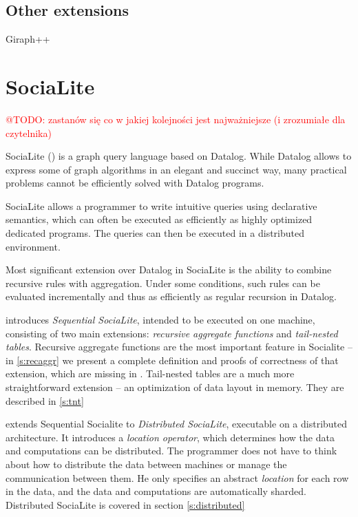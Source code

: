 \documentclass{pracamgr}
\makeatletter
\theoremstyle{plain}
\theoremstyle{definition}
\theoremstyle{remark}
\newcommand{\todo}[1]{\textcolor{red}{@TODO: #1}}
\makeatother
\begin{document}
\section{Other extensions}
Giraph++



\chapter{SociaLite}\label{r:socialite}

\todo{zastanów się co w jakiej kolejności jest najważniejsze (i zrozumiałe dla czytelnika)}

SociaLite (\cite{socialite, distsoc}) is a graph query language based on Datalog. While Datalog allows to express some of graph algorithms
in an elegant and succinct way, many practical problems cannot be efficiently solved with Datalog programs. 

SociaLite allows a programmer to write intuitive queries using declarative semantics, which can often be executed as efficiently as highly optimized dedicated programs. The queries can then be executed in a distributed environment.

Most significant extension over Datalog in SociaLite is the ability to combine recursive rules with aggregation. Under some conditions, such rules can be evaluated incrementally and thus as efficiently as regular recursion in Datalog.

\cite{socialite} introduces \emph{Sequential SociaLite}, intended to be executed on one machine, consisting of two main extensions: \emph{recursive aggregate functions} and \emph{tail-nested tables}. Recursive aggregate functions are the most important feature in Socialite -- in \ref{s:recaggr} we present a complete definition and proofs of correctness of that extension, which are missing in \cite{socialite}. Tail-nested tables are a much more straightforward extension -- an optimization of data layout in memory. They are described in \ref{s:tnt}

\cite{distsoc} extends Sequential Socialite to \emph{Distributed SociaLite}, executable on a distributed architecture. It introduces a \emph{location operator}, which determines how the data and computations can be distributed. The programmer does not have to think about how to distribute the data between machines or manage the communication between them. He only specifies an abstract \emph{location} for each row in the data, and the data and computations are automatically sharded. Distributed SociaLite is covered in section \ref{s:distributed}
\end{document}
